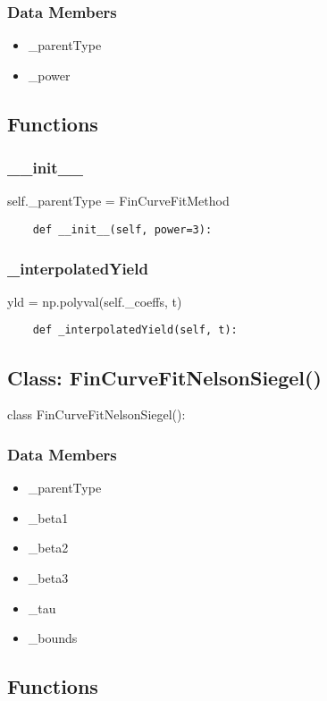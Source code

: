 \documentclass[twoside,11pt]{book}
\begin{document}
\subsubsection*{Data Members}
\begin{itemize}
\item{\_parentType}
\item{\_power}
\end{itemize}

\subsection*{Functions}

\subsubsection*{{\bf \_\_init\_\_}}
self.\_parentType = FinCurveFitMethod 

\begin{lstlisting}
    def __init__(self, power=3):
\end{lstlisting}

\subsubsection*{{\bf \_interpolatedYield}}
yld = np.polyval(self.\_coeffs, t) 

\begin{lstlisting}
    def _interpolatedYield(self, t):
\end{lstlisting}

\subsection*{Class: FinCurveFitNelsonSiegel()}
class FinCurveFitNelsonSiegel(): 

\subsubsection*{Data Members}
\begin{itemize}
\item{\_parentType}
\item{\_beta1}
\item{\_beta2}
\item{\_beta3}
\item{\_tau}
\item{\_bounds}
\end{itemize}

\subsection*{Functions}
\end{document}
